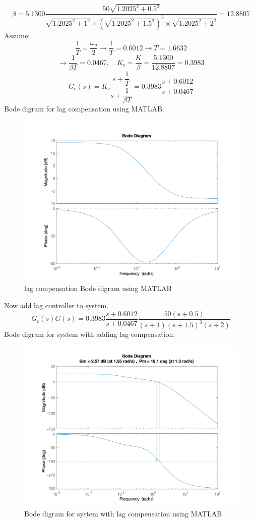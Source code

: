 $$
\beta = 5.1300\dfrac{50\sqrt{1.2025^2+0.5^2}}{\sqrt{1.2025^2+1^2}\times(\sqrt{1.2025^2 + 1.5^2})^3\times\sqrt{1.2025^2 + 2^2}} = 12.8807
$$
Assume:
$$
\dfrac{1}{T} = \dfrac{\omega_g}{2} 
\to \dfrac{1}{T}  = 0.6012 \to T = 1.6632
$$
$$
\to \dfrac{1}{\beta T} = 0.0467, \quad K_c = \dfrac{K}{\beta} = \dfrac{5.1300}{12.8807} = 0.3983
$$
$$
G_c(s) = K_c \dfrac{s + \dfrac{1}{T}}{s + \dfrac{1}{\beta T}}
= 0.3983 \dfrac{s + 0.6012}{s + 0.0467}
$$
Bode digram for lag compensation using MATLAB.
\begin{figure}[H]
	\caption{lag compensation Bode digram using MATLAB}
	\centering
	\includegraphics[width=12cm]{../Figure/Q1/b/controller.png}
\end{figure}
Now add lag controller to system.
$$
G_c(s)G(s) = 0.3983 \dfrac{s + 0.6012}{s + 0.0467}\dfrac{50(s+0.5)}{(s+1)(s+1.5)^{3}(s+2)}
$$
Bode digram for system with adding lag compensation.
\begin{figure}[H]
	\caption{Bode digram for system with lag compensation using MATLAB}
	\centering
	\includegraphics[width=12cm]{../Figure/Q1/b/new_margin.png}
\end{figure}
